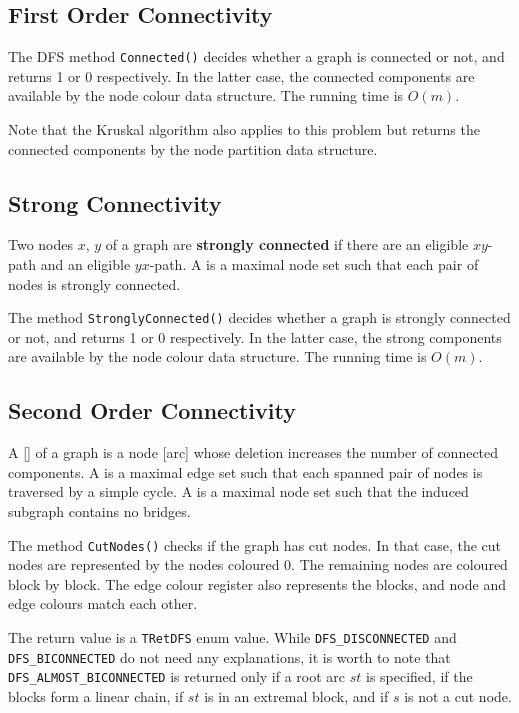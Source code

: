 \documentclass[a4paper,11pt,twoside]{book}
\begin{document}
\begin{multicols}{2}
\subsection{First Order Connectivity}
The DFS method \verb/Connected()/ decides whether a graph is connected or
not, and returns 1 or 0 respectively. In the latter case, the connected
components are available by the node colour data structure. The running
time is $O(m)$.

Note that the Kruskal algorithm also applies to this problem but returns the
connected components by the node partition data structure.


\subsection{Strong Connectivity}
Two nodes $x$, $y$ of a graph are {\bf strongly connected}
 if there are
an eligible $xy$-path and an eligible $yx$-path. A 
is a maximal node set such that each pair of nodes is strongly connected.

The method \verb/StronglyConnected()/ decides whether a graph is strongly
connected or not, and returns 1 or 0 respectively. In the latter case, the
strong components are available by the node colour data structure. The running
time is $O(m)$.


\subsection{Second Order Connectivity}
A  [] of a graph is a node [arc] whose deletion increases
the number of connected components. A  is a maximal edge set such that each
spanned pair of nodes is traversed by a simple cycle. A 
is a maximal node set such that the induced subgraph contains no bridges.

The method \verb/CutNodes()/ checks if the graph has cut nodes. In that case,
the cut nodes are represented by the nodes coloured $0$. The remaining nodes
are coloured block by block. The edge colour register also represents the blocks,
and node and edge colours match each other.

The return value is a \verb/TRetDFS/
enum value. While \verb/DFS_DISCONNECTED/ and \verb/DFS_BICONNECTED/ do not
need any explanations, it is worth to note that \verb/DFS_ALMOST_BICONNECTED/
is returned only if a root arc $st$ is specified, if the blocks form a linear chain,
if $st$ is in an extremal block, and if $s$ is not a cut node.


\end{multicols}
\end{document}
